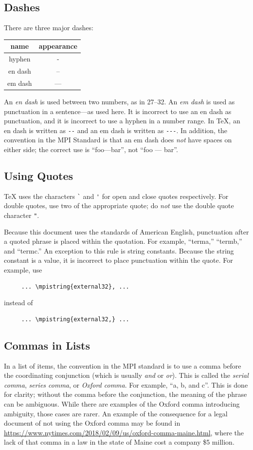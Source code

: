 \documentclass[letterpaper,twoside,11pt,fleqn]{article}
\def\MPI/{\textsf{MPI}}    %
\begin{document}
\subsection{Dashes}
There are three major dashes:
\begin{center}
\begin{tabular}{|c|c|}\hline
\textbf{name}&\textbf{appearance}\\\hline
hyphen&-\\\hline
en dash&--\\\hline
em dash&---\\\hline
\end{tabular}
\end{center}
An \emph{en dash} is used between two numbers, as in 27--32.  An
\emph{em dash} is used as punctuation in a sentence---as used here.
It is incorrect to use an en dash as punctuation, and it is incorrect
to use a hyphen in a number range.  In TeX, an en dash is written as
\verb+--+ and an em dash is written as \verb+---+.
In addition, the convention in the MPI Standard is that an em dash does
\emph{not} have spaces on either side; the correct use is ``foo---bar'', not
``foo --- bar''.

\subsection{Using Quotes}\label{sec:using-quotes}
TeX uses the characters \verb+`+ and \verb+'+ for open and close
quotes respectively.
For double quotes, use two of the appropriate quote; do \emph{not} use
the double quote character \verb+"+.

Because this document uses the standards of American English,
punctuation after a quoted phrase is placed within the quotation.
For example, ``terma,'' ``termb,'' and ``termc.''
An exception to this rule is string constants.
Because the string constant is a value, it is incorrect to place
punctuation within the quote.
For example, use
\begin{verbatim}
     ... \mpistring{external32}, ...
\end{verbatim}
instead of
\begin{verbatim}
     ... \mpistring{external32,} ...
\end{verbatim}

\subsection{Commas in Lists}\label{sec:oxford-comma}
In a list of items, the convention in the \MPI/ standard is to use a
comma before the coordinating conjunction (which is usually \emph{and}
or \emph{or}).
This is called the \emph{serial comma}, \emph{series comma}, or
\emph{Oxford comma}.
For example, ``a, b, and c''.
This is done for clarity; without the comma before the
conjunction, the meaning of the phrase can be ambiguous.
While there are examples of the Oxford comma introducing ambiguity,
those cases are rarer.
An example of the consequence for a legal document of not using the
Oxford comma may be found in
\url{https://www.nytimes.com/2018/02/09/us/oxford-comma-maine.html},
where the lack of that comma in a law in the state of Maine cost a
company \$5 million.
\end{document}
